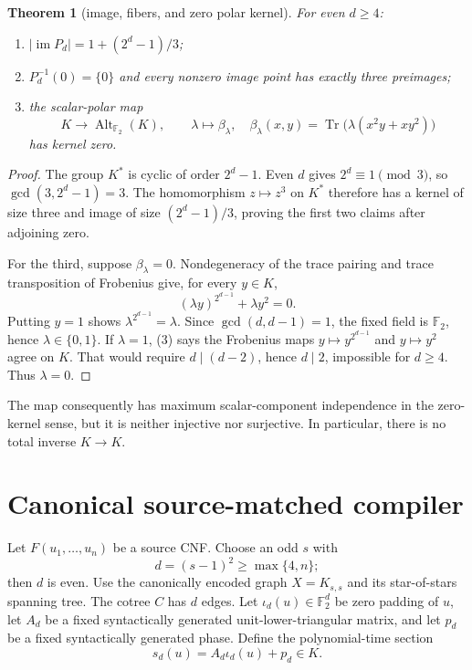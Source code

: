 \documentclass[11pt]{article}
\newtheorem{theorem}{Theorem}
\newcommand{\F}{\mathbb F_2}
\begin{document}
\begin{theorem}[image, fibers, and zero polar kernel]
For even $d\ge4$:
\begin{enumerate}
\item $|\operatorname{im}P_d|=1+(2^d-1)/3$;
\item $P_d^{-1}(0)=\{0\}$ and every nonzero image point has exactly three
preimages;
\item the scalar-polar map
\[
K\longrightarrow\operatorname{Alt}_{\F}(K),\qquad
\lambda\longmapsto\beta_\lambda,
\quad
\beta_\lambda(x,y)=\operatorname{Tr}\!\bigl(
 \lambda(x^2y+xy^2)\bigr)                               \tag{2}
\]
has kernel zero.
\end{enumerate}
\end{theorem}
\begin{proof}
The group $K^*$ is cyclic of order $2^d-1$.  Even $d$ gives
$2^d\equiv1\pmod3$, so $\gcd(3,2^d-1)=3$.  The homomorphism
$z\mapsto z^3$ on $K^*$ therefore has a kernel of size three and image of
size $(2^d-1)/3$, proving the first two claims after adjoining zero.

For the third, suppose $\beta_\lambda=0$.  Nondegeneracy of the trace pairing
and trace transposition of Frobenius give, for every $y\in K$,
\[
(\lambda y)^{2^{d-1}}+\lambda y^2=0.                    \tag{3}
\]
Putting $y=1$ shows $\lambda^{2^{d-1}}=\lambda$.  Since
$\gcd(d,d-1)=1$, the fixed field is $\mathbb F_2$, hence
$\lambda\in\{0,1\}$.  If $\lambda=1$, (3) says the Frobenius maps
$y\mapsto y^{2^{d-1}}$ and $y\mapsto y^2$ agree on $K$.  That would require
$d\mid(d-2)$, hence $d\mid2$, impossible for $d\ge4$.  Thus
$\lambda=0$.
\end{proof}

The map consequently has maximum scalar-component independence in the
zero-kernel sense, but it is neither injective nor surjective.  In particular,
there is no total inverse $K\to K$.

\section{Canonical source-matched compiler}
Let $F(u_1,\ldots,u_n)$ be a source CNF.  Choose an odd $s$ with
\[
d=(s-1)^2\ge\max\{4,n\};                                \tag{4}
\]
then $d$ is even.  Use the canonically encoded graph $X=K_{s,s}$ and its
star-of-stars spanning tree.  The cotree $C$ has $d$ edges.  Let
$\iota_d(u)\in\F^d$ be zero padding of $u$, let $A_d$ be a fixed
syntactically generated unit-lower-triangular matrix, and let $p_d$ be a
fixed syntactically generated phase.  Define the polynomial-time section
\[
s_d(u)=A_d\iota_d(u)+p_d\in K.                           \tag{5}
\]
\end{document}
